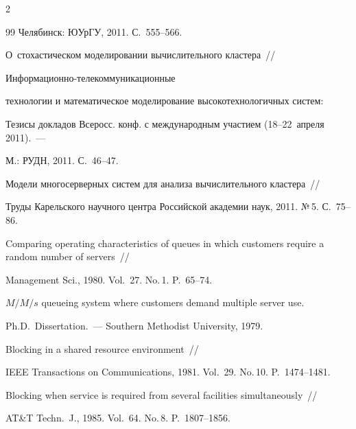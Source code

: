 \begin{multicols}{2}
{{\begin{thebibliography}{99}
Челябинск: ЮУрГУ, 2011. С.~555--566.





О~стохастическом моделировании вычислительного кластера~// 

Ин\-фор\-ма\-ци\-он\-но-те\-ле\-ком\-му\-ни\-ка\-ци\-он\-ные 

технологии и математическое моделирование высокотехнологичных систем: 

Тезисы докладов Всеросс. конф. с международным учас\-ти\-ем (18--22~апреля 2011).~--- 

М.: РУДН, 2011. С.~46--47.





Модели многосерверных систем для анализа вычислительного кластера~// 

Труды Карельского научного центра Российской академии наук, 2011. №\,5. С.~75--86.





Comparing operating characteristics of queues in which customers require a random number of servers~// 

Management Sci., 1980. Vol.~27. No.\,1. P.~65--74.




 $M/M/s$ queueing system where customers demand multiple server use. 

Ph.D.\ Dissertation.~--- Southern Methodist University, 1979.




 Blocking in a shared resource environment~// 

IEEE Transactions on Communications, 1981. Vol.~29. No.\,10. P.~1474--1481.




 Blocking when service is required from several facilities simultaneously~// 

AT\&T Techn.~J., 1985. Vol.~64. No.\,8. P.~1807--1856.






\end{thebibliography}}}
\end{multicols}
